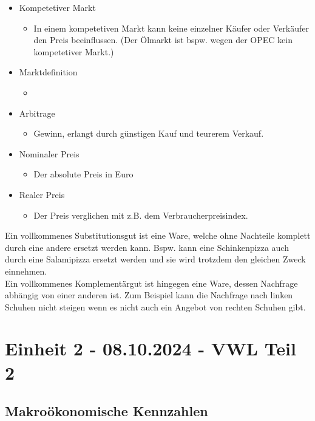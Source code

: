 \documentclass{article}
\begin{document}
	\begin{itemize}
		\item{Kompetetiver Markt}
		\begin{itemize}
			\item{In einem kompetetiven Markt kann keine einzelner Käufer oder Verkäufer den Preis beeinflussen. (Der Ölmarkt ist bspw. wegen der OPEC kein kompetetiver Markt.)}
		\end{itemize}
		\item{Marktdefinition}
		\begin{itemize}
			\item{}
		\end{itemize}
		\item{Arbitrage}
		\begin{itemize}
			\item{Gewinn, erlangt durch günstigen Kauf und teurerem Verkauf.}
		\end{itemize}
		\item{Nominaler Preis}
		\begin{itemize}
			\item{Der absolute Preis in Euro}
		\end{itemize}
		\item{Realer Preis}
		\begin{itemize}
			\item{Der Preis verglichen mit z.B. dem Verbraucherpreisindex.}
		\end{itemize}
	\end{itemize}
	Ein vollkommenes Substitutionsgut ist eine Ware, welche ohne Nachteile komplett durch eine andere ersetzt werden kann. Bspw. kann eine Schinkenpizza auch durch eine Salamipizza ersetzt werden und sie wird trotzdem den gleichen Zweck einnehmen. \\
	Ein vollkommenes Komplementärgut ist hingegen eine Ware, dessen Nachfrage abhängig von einer anderen ist. Zum Beispiel kann die Nachfrage nach linken Schuhen nicht steigen wenn es nicht auch ein Angebot von rechten Schuhen gibt.
	\section{Einheit 2 - 08.10.2024 - VWL Teil 2}
	\subsection{Makroökonomische Kennzahlen}
\end{document}
